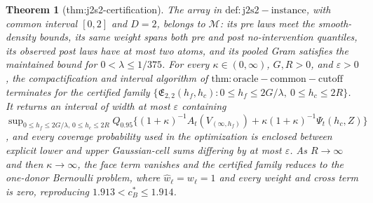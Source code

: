 \documentclass{article}
\newtheorem{theorem}{Theorem}
\begin{document}
\begin{theorem}[thm:j2s2-certification]\label{thm:j2s2-certification}
The array in \(\mathrm{def:j2s2-instance}\), with common interval \([0,2]\) and \(D=2\), belongs to \(\mathcal M\): its pre laws meet the smooth-density bounds, its same weight spans both pre and post no-intervention quantiles, its observed post laws have at most two atoms, and its pooled Gram satisfies the maintained bound for \(0<\lambda\leq1/375\). For every \(\kappa\in(0,\infty)\), \(G,R>0\), and \(\varepsilon>0\), the compactification and interval algorithm of \(\mathrm{thm:oracle-common-cutoff}\) terminates for the certified family \(\{\mathfrak E_{2,2}(h_f,h_c):0\leq h_f\leq2G/\lambda,\ 0\leq h_c\leq2R\}\). It returns an interval of width at most \(\varepsilon\) containing \(\sup_{0\leq h_f\leq2G/\lambda,\,0\leq h_c\leq2R}Q_{0.95}\{(1+\kappa)^{-1}A_t(V_{(\infty,h_f)})+\kappa(1+\kappa)^{-1}\Psi_t(h_c,Z)\}\), and every coverage probability used in the optimization is enclosed between explicit lower and upper Gaussian-cell sums differing by at most \(\varepsilon\). As \(R\to\infty\) and then \(\kappa\to\infty\), the face term vanishes and the certified family reduces to the one-donor Bernoulli problem, where \(\widehat w_\ell=w_\ell=1\) and every weight and cross term is zero, reproducing \(1.913<c_B^*\leq1.914\).
\end{theorem}
\end{document}
